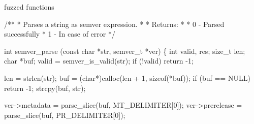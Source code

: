 \documentclass[
  a4paper,
]{scrreprt}
\newenvironment{Shaded}{\begin{snugshade}}{\end{snugshade}}
\newcommand{\CommentTok}[1]{\textcolor[rgb]{0.41,0.41,0.41}{#1}}
\newcommand{\ControlFlowTok}[1]{\textcolor[rgb]{0.85,0.12,0.09}{#1}}
\newcommand{\DataTypeTok}[1]{\textcolor[rgb]{0.47,0.16,0.63}{#1}}
\newcommand{\DecValTok}[1]{\textcolor[rgb]{0.47,0.16,0.63}{#1}}
\newcommand{\KeywordTok}[1]{\textcolor[rgb]{0.85,0.12,0.09}{#1}}
\newcommand{\NormalTok}[1]{\textcolor[rgb]{0.33,0.33,0.33}{#1}}
\newcommand{\OperatorTok}[1]{\textcolor[rgb]{0.00,0.46,0.62}{#1}}
\theoremstyle{definition}
\theoremstyle{remark}
\begin{document}
fuzzed functions

\begin{Shaded}
\begin{Highlighting}[numbers=left,,]
\CommentTok{/**}
\CommentTok{ * Parses a string as semver expression.}
\CommentTok{ *}
\CommentTok{ * Returns:}
\CommentTok{ *}
\CommentTok{ * \textasciigrave{}0\textasciigrave{} {-} Parsed successfully}
\CommentTok{ * \textasciigrave{}{-}1\textasciigrave{} {-} In case of error}
\CommentTok{ */}

\DataTypeTok{int}
\NormalTok{semver\_parse }\OperatorTok{(}\DataTypeTok{const} \DataTypeTok{char} \OperatorTok{*}\NormalTok{str}\OperatorTok{,}\NormalTok{ semver\_t }\OperatorTok{*}\NormalTok{ver}\OperatorTok{)} \OperatorTok{\{}
  \DataTypeTok{int}\NormalTok{ valid}\OperatorTok{,}\NormalTok{ res}\OperatorTok{;}
  \DataTypeTok{size\_t}\NormalTok{ len}\OperatorTok{;}
  \DataTypeTok{char} \OperatorTok{*}\NormalTok{buf}\OperatorTok{;}
\NormalTok{  valid }\OperatorTok{=}\NormalTok{ semver\_is\_valid}\OperatorTok{(}\NormalTok{str}\OperatorTok{);}
  \ControlFlowTok{if} \OperatorTok{(!}\NormalTok{valid}\OperatorTok{)} \ControlFlowTok{return} \OperatorTok{{-}}\DecValTok{1}\OperatorTok{;}

\NormalTok{  len }\OperatorTok{=}\NormalTok{ strlen}\OperatorTok{(}\NormalTok{str}\OperatorTok{);}
\NormalTok{  buf }\OperatorTok{=} \OperatorTok{(}\DataTypeTok{char}\OperatorTok{*)}\NormalTok{calloc}\OperatorTok{(}\NormalTok{len }\OperatorTok{+} \DecValTok{1}\OperatorTok{,} \KeywordTok{sizeof}\OperatorTok{(*}\NormalTok{buf}\OperatorTok{));}
  \ControlFlowTok{if} \OperatorTok{(}\NormalTok{buf }\OperatorTok{==}\NormalTok{ NULL}\OperatorTok{)} \ControlFlowTok{return} \OperatorTok{{-}}\DecValTok{1}\OperatorTok{;}
\NormalTok{  strcpy}\OperatorTok{(}\NormalTok{buf}\OperatorTok{,}\NormalTok{ str}\OperatorTok{);}

\NormalTok{  ver}\OperatorTok{{-}\textgreater{}}\NormalTok{metadata }\OperatorTok{=}\NormalTok{ parse\_slice}\OperatorTok{(}\NormalTok{buf}\OperatorTok{,}\NormalTok{ MT\_DELIMITER}\OperatorTok{[}\DecValTok{0}\OperatorTok{]);}
\NormalTok{  ver}\OperatorTok{{-}\textgreater{}}\NormalTok{prerelease }\OperatorTok{=}\NormalTok{ parse\_slice}\OperatorTok{(}\NormalTok{buf}\OperatorTok{,}\NormalTok{ PR\_DELIMITER}\OperatorTok{[}\DecValTok{0}\OperatorTok{]);}


\end{Highlighting}
\end{Shaded}
\end{document}
